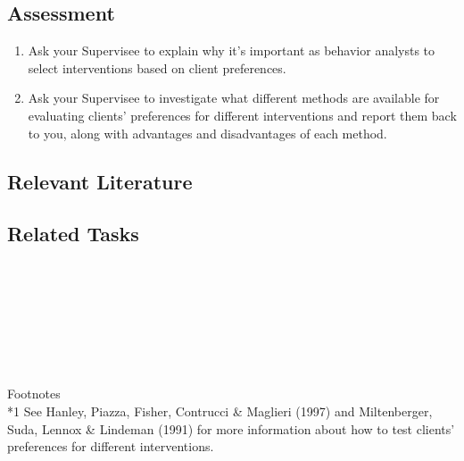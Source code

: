 \subsection{Assessment}
\begin{enumerate}
\item Ask your Supervisee to explain why it's important as behavior analysts to select interventions based on client preferences. 
\item Ask your Supervisee to investigate what different methods are available for evaluating clients' preferences for different interventions and report them back to you, along with advantages and disadvantages of each method.
\end{enumerate}
%
\subsection{Relevant Literature}
\begin{refsection}
\nocite{bailey2013ethics,
        bannerman1990balancing,
        berk1976effects,
        hanley1997evaluation,
        hanley2005effectiveness,
        mendonca1983effects,
        miltenberger1991assessing,
        perlmuter1973effect}
\printbibliography[heading=none]
\end{refsection}
\subsection{Related Tasks}
\foureEight{}\\
\fouriSeven{}\\
\fourjTwo{}\\
\fourjFive{}\\
\fourjSix{}\\
\fourjSeven{}\\
\fourjEight{}\\
%
Footnotes\\
*1 See Hanley, Piazza, Fisher, Contrucci \& Maglieri (1997) and Miltenberger, Suda, Lennox \& Lindeman (1991) for more information about how to test clients' preferences for different interventions.\\
